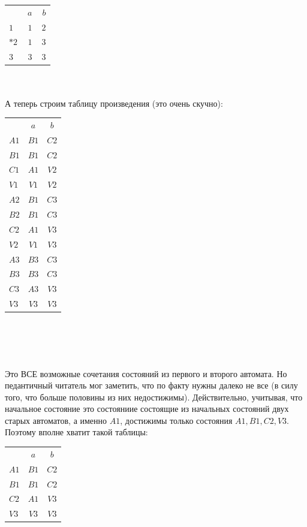 \documentclass[14pt]{extreport}
\begin{document}
		\begin{tabular}{lrr}
			 & $\ a$ & $\ b$ \\
			 $1$ & $1$ & $2$ \\
			 $*2$ & $1$ & $3$ \\
			 $3$ & $3$ & $3$ \\
		\end{tabular}\\\\
	А теперь строим таблицу произведения (это очень скучно):\\
		\begin{tabular}{lcc}
			 & $a$ & $b$ \\
			 $A1$ & $B1$ & $C2$ \\
			 $B1$ & $B1$ & $C2$ \\
			 $C1$ & $A1$ & $V2$ \\
			 $V1$ & $V1$ & $V2$ \\
			 $A2$ & $B1$ & $C3$ \\
			 $B2$ & $B1$ & $C3$ \\
			 $C2$ & $A1$ & $V3$ \\
			 $V2$ & $V1$ & $V3$ \\
			 $A3$ & $B3$ & $C3$ \\
			 $B3$ & $B3$ & $C3$ \\
			 $C3$ & $A3$ & $V3$ \\
			 $V3$ & $V3$ & $V3$ \\
		\end{tabular}\\\\\\\\
	Это ВСЕ возможные сочетания состояний из первого и второго автомата. Но педантичный читатель
	мог заметить, что по факту нужны далеко не все (в силу того, что больше половины из них
	недостижимы). Действительно, учитывая, что начальное состояние это состояниие состоящие
	из начальных состояний двух старых автоматов, а именно $A1$, достижимы только состояния
	$A1,B1,C2,V3$.\\
	Поэтому вполне хватит такой таблицы:\\
		\begin{tabular}{lcc}
			 & $a$ & $b$ \\
			 $A1$ & $B1$ & $C2$ \\
			 $B1$ & $B1$ & $C2$ \\
			 $C2$ & $A1$ & $V3$ \\
			 $V3$ & $V3$ & $V3$ \\
		\end{tabular}\\\\
\end{document}
